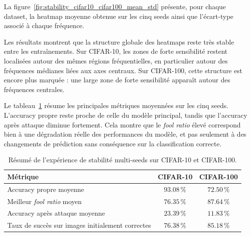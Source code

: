 La figure~\ref{fig:stability_cifar10_cifar100_mean_std} présente,
pour chaque dataset, la heatmap moyenne obtenue sur les cinq seeds ainsi que l'écart-type associé
à chaque fréquence.

Les résultats montrent que la structure globale des heatmaps reste très stable entre les entraînements.
Sur CIFAR-10, les zones de forte sensibilité restent localisées autour des mêmes régions fréquentielles,
en particulier autour des fréquences médianes liées aux axes centraux. Sur CIFAR-100, cette structure
est encore plus marquée : une large zone de forte sensibilité apparaît autour des fréquences centrales.


Le tableau~\ref{tab:stability_multiseed_metrics} résume les principales métriques moyennées sur les cinq
seeds. L'accuracy propre reste proche de celle du modèle principal, tandis que l'accuracy après attaque
diminue fortement. Cela montre que le \textit{fool ratio} élevé correspond bien à une dégradation réelle
des performances du modèle, et pas seulement à des changements de prédiction sans conséquence sur
la classification correcte.

\begin{table}[H]
    \centering
    \begin{tabular}{l|c|c}
        \hline
        Métrique & CIFAR-10 & CIFAR-100 \\
        \hline
        Accuracy propre moyenne & $93.08\,\%$ & $72.50\,\%$ \\
        Meilleur \textit{fool ratio} moyen & $76.35\,\%$ & $87.64\,\%$ \\
        Accuracy après attaque moyenne & $23.39\,\%$ & $11.83\,\%$ \\
        Taux de succès sur images initialement correctes & $76.38\,\%$ & $85.18\,\%$ \\
        \hline
    \end{tabular}
    \caption{Résumé de l'expérience de stabilité multi-seeds sur CIFAR-10 et CIFAR-100.}
    \label{tab:stability_multiseed_metrics}
\end{table}

